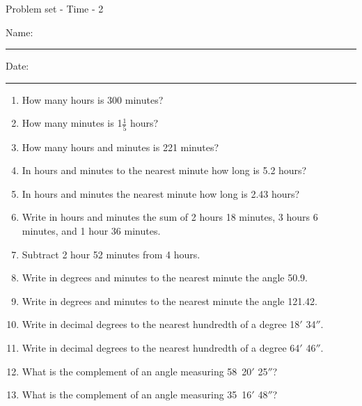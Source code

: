 \documentclass[12pt,fleqn]{article} %
\begin{document}
\pagestyle{empty} %
		\newcommand{\spacing}{\vspace{0.70in}}
\begin{center}
          Problem set - Time - 2 \\[0.5in]
\end{center}
  \vspace{0.25in}

Name: \rule{4in}{0.005in} Date: \rule{1.4in}{0.005in} 

\begin{enumerate}

  \item How many hours is 300 minutes? 
  \spacing

  \item How many minutes is 1$\frac{1}{5}$ hours? 
  \spacing

  \item How many hours and minutes is 221 minutes? 
  \spacing

  \item In hours and minutes to the nearest minute how long is 5.2 hours? 
  \spacing

  \item In hours and minutes the nearest minute how long is 2.43 hours? 
  \spacing

  \item Write in hours and minutes the sum of 2 hours 18 minutes, 3 hours 6 minutes, and 1 hour 36 minutes.
  \spacing

  \item Subtract 2 hour 52 minutes from 4 hours.
  \spacing

  \item Write in degrees and minutes to the nearest minute the angle 50.9\degree. 
  \spacing

  \item Write in degrees and minutes to the nearest minute the angle 121.42\degree. 
  \spacing

  \item Write in decimal degrees to the nearest hundredth of a degree 18$'$ 34$''$. 
  \spacing

  \item Write in decimal degrees to the nearest hundredth of a degree 64$'$ 46$''$. 
  \spacing

  \item What is the complement of an angle measuring 58\degree\ 20$'$ 25$''$?
  \spacing

  \item What is the complement of an angle measuring 35\degree\ 16$'$ 48$''$?
  \spacing


\end{enumerate}
\end{document}
